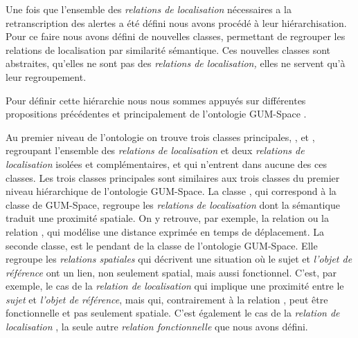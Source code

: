 Une fois que l'ensemble des \emph{relations de localisation}
nécessaires a la retranscription des alertes a été défini nous avons
procédé à leur hiérarchisation. Pour ce faire nous avons défini de
nouvelles classes, permettant de regrouper les relations de
localisation par similarité sémantique. Ces nouvelles classes sont
abstraites, \ie qu'elles ne sont pas des \emph{relations de
  localisation,} elles ne servent qu'à leur regroupement.

Pour définir cette hiérarchie nous nous sommes appuyés sur différentes
propositions précédentes et principalement de l'ontologie GUM-Space
\autocite{Bateman2010}.

Au premier niveau de l'ontologie on trouve trois classes principales,
,
 et
,
regroupant l'ensemble des \emph{relations de localisation} et deux
\emph{relations de localisation} isolées et complémentaires,
 et 
qui n'entrent dans aucune des ces classes. Les trois classes
principales sont similaires aux trois classes du premier niveau
hiérarchique de l'ontologie GUM-Space. La classe
, qui
correspond à la classe
 de GUM-Space,
regroupe les \emph{relations de localisation} dont la sémantique
traduit une proximité spatiale. On y retrouve, par exemple, la
relation  ou la relation
, qui modélise une distance exprimée
en temps de déplacement. La seconde classe,
 est le
pendant de la classe
 de
l'ontologie GUM-Space. Elle regroupe les \emph{relations spatiales}
qui décrivent une situation où le sujet et \emph{l'objet de référence}
ont un lien, non seulement spatial, mais aussi fonctionnel. C'est, par
exemple, le cas de la \emph{relation de localisation}
 qui implique une proximité entre le
\emph{sujet} et \emph{l'objet de référence}, mais qui, contrairement à
la relation , peut être fonctionnelle et pas
seulement spatiale. C'est également le cas de la \emph{relation de
  localisation}
,
la seule autre \emph{relation fonctionnelle} que nous avons défini.
